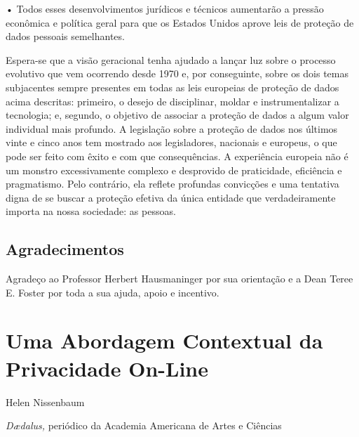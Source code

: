 • Todos esses desenvolvimentos jurídicos e técnicos aumentarão a pressão
econômica e política geral para que os Estados Unidos aprove leis de
proteção de dados pessoais semelhantes.

Espera-se que a visão geracional tenha ajudado a lançar luz sobre o
processo evolutivo que vem ocorrendo desde 1970 e, por conseguinte,
sobre os dois temas subjacentes sempre presentes em todas as leis
europeias de proteção de dados acima descritas: primeiro, o desejo de
disciplinar, moldar e instrumentalizar a tecnologia; e, segundo, o
objetivo de associar a proteção de dados a algum valor individual mais
profundo. A legislação sobre a proteção de dados nos últimos vinte e
cinco anos tem mostrado aos legisladores, nacionais e europeus, o que
pode ser feito com êxito e com que consequências. A experiência europeia
não é um monstro excessivamente complexo e desprovido de praticidade,
eficiência e pragmatismo. Pelo contrário, ela reflete profundas
convicções e uma tentativa digna de se buscar a proteção efetiva da
única entidade que verdadeiramente importa na nossa sociedade: as
pessoas.

\section{Agradecimentos}

Agradeço ao Professor Herbert Hausmaninger por sua orientação e a Dean
Teree E. Foster por toda a sua ajuda, apoio e incentivo.

\chapter{Uma Abordagem Contextual da Privacidade
On-Line}\label{uma-abordagem-contextual-da-privacidade-on-line}

Helen Nissenbaum

\emph{Dædalus,} periódico da Academia Americana de Artes e Ciências

